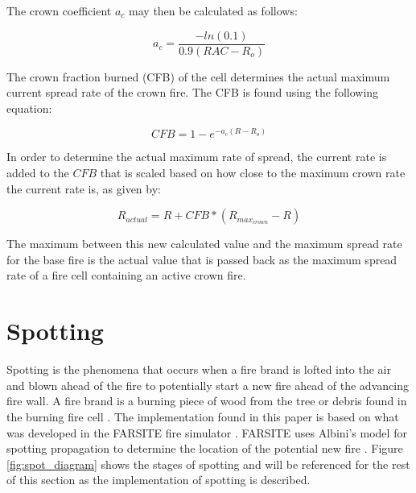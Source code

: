 The crown coefficient $a_c$ may then be calculated as follows:

\begin{equation}
a_c = \frac{-ln(0.1)}{0.9(RAC - R_o)}
\end{equation}

The crown fraction burned (CFB) of the cell determines the actual maximum current spread rate of the crown fire. The CFB is found using the following equation: 

\begin{equation}
CFB = 1 - e^{-a_c(R-R_o)}
\end{equation}

In order to determine the actual maximum rate of spread, the current rate is added to the $CFB$ that is scaled based on how close to the maximum crown rate the current rate is, as given by: 

\begin{equation}
R_{actual} = R + CFB * (R_{max_{crown}} - R)
\end{equation}

The maximum between this new calculated value and the maximum spread rate for the base fire is the actual value that is passed back as the maximum spread rate of a fire cell containing an active crown fire. 

\section{Spotting}
Spotting is the phenomena that occurs when a fire brand is lofted into the air and blown ahead of the fire to potentially start a new fire ahead of the advancing fire wall. A fire brand is a burning piece of wood from the tree or debris found in the burning fire cell \cite{firereview}. The implementation found in this paper is based on what was developed in the FARSITE fire simulator \cite{FARSITE}. FARSITE uses Albini's model for spotting propagation to determine the location of the potential new fire \cite{albini}. Figure \ref{fig:spot_diagram} shows the stages of spotting and will be referenced for the rest of this section as the implementation of spotting is described. 

